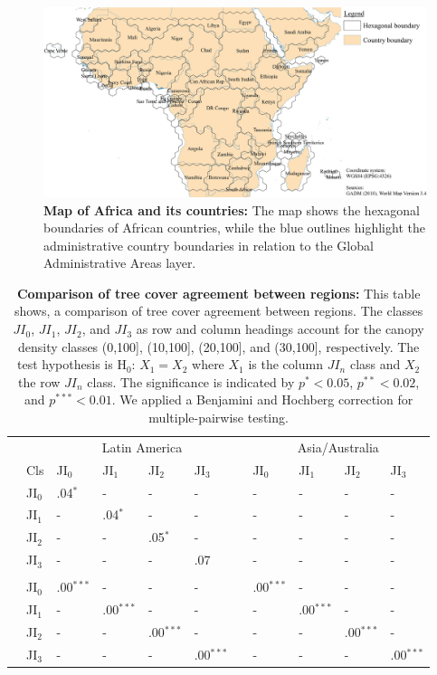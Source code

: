 	\begin{figure}[t]
		\centering
		\includegraphics[scale=.97]{img/africa_hexagonal_boundaries}
		\caption[Map of Africa and its countries]{\textbf{Map of Africa and its countries:} The map shows the hexagonal boundaries of African countries, while the blue outlines highlight the administrative country boundaries in relation to the Global Administrative Areas layer.}
		\label{fig:africa_hexagonal_appendix}
	\end{figure}
	\begin{table}[ht]
		\centering
		\caption[Comparison of tree cover agreement between regions]{\textbf{Comparison of tree cover agreement between regions:} This table shows, a comparison of tree cover agreement between regions. The classes $JI_0$, $JI_1$, $JI_2$, and $JI_3$ as row and column headings account for the canopy density classes (0,100], (10,100], (20,100], and (30,100], respectively. The test hypothesis is H$_0$: $X_1=X_2$ where $X_1$ is the column $JI_n$ class and $X_2$ the row $JI_n$ class. The significance is indicated by $p^{*}<0.05$, $p^{**}<0.02$, and $p^{***}<0.01$. We applied a Benjamini and Hochberg correction for multiple-pairwise testing.}
		\label{tab:wilcoxononesided_comparison}
		\begin{tabular}{lllllllllll}
			\hline
			& & \multicolumn{4}{c}{Latin America} && \multicolumn{4}{c}{Asia/Australia} \\\cline{3-6}\cline{8-11}
			& Cls & JI$_0$ & JI$_1$ & JI$_2$ & JI$_3$ && JI$_0$ & JI$_1$ & JI$_2$ & JI$_3$ \\\hline
			\multirow{4}{*}{\STAB{\rotatebox[origin=c]{90}{Asia}}}
			& JI$_0$ & .04$^{*}$ & - & - & - && - & - & - & - \\
			& JI$_1$ & - & .04$^{*}$ & - & - && - & - & - & - \\
			& JI$_2$ & - & - & .05$^{*}$ & - && - & - & - & - \\
			& JI$_3$ & - & - & - & .07 && - & - & - & - \\
			&&&&&&&&&&\\
			\multirow{4}{*}{\STAB{\rotatebox[origin=c]{90}{Africa}}} 
			& JI$_0$ & .00$^{***}$ & - & - & - && .00$^{***}$ & - & - & - \\
			& JI$_1$ & - & .00$^{***}$ & - & - && - & .00$^{***}$ & - & - \\
			& JI$_2$ & - & - & .00$^{***}$ & - && - & - & .00$^{***}$ & - \\
			& JI$_3$ & - & - & - & .00$^{***}$ && - & - & - & .00$^{***}$ \\\hline
		\end{tabular}
	\end{table}
